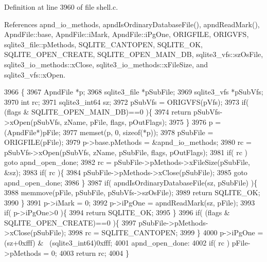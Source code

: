 Definition at line 3960 of file shell.\+c.



References apnd\+\_\+io\+\_\+methods, apnd\+Is\+Ordinary\+Database\+File(), apnd\+Read\+Mark(), Apnd\+File\+::base, Apnd\+File\+::i\+Mark, Apnd\+File\+::i\+Pg\+One, O\+R\+I\+G\+F\+I\+LE, O\+R\+I\+G\+V\+FS, sqlite3\+\_\+file\+::p\+Methods, S\+Q\+L\+I\+T\+E\+\_\+\+C\+A\+N\+T\+O\+P\+EN, S\+Q\+L\+I\+T\+E\+\_\+\+OK, S\+Q\+L\+I\+T\+E\+\_\+\+O\+P\+E\+N\+\_\+\+C\+R\+E\+A\+TE, S\+Q\+L\+I\+T\+E\+\_\+\+O\+P\+E\+N\+\_\+\+M\+A\+I\+N\+\_\+\+DB, sqlite3\+\_\+vfs\+::sz\+Os\+File, sqlite3\+\_\+io\+\_\+methods\+::x\+Close, sqlite3\+\_\+io\+\_\+methods\+::x\+File\+Size, and sqlite3\+\_\+vfs\+::x\+Open.


\begin{DoxyCode}
3966  \{
3967   ApndFile *p;
3968   sqlite3_file *pSubFile;
3969   sqlite3_vfs *pSubVfs;
3970   \textcolor{keywordtype}{int} rc;
3971   sqlite3_int64 sz;
3972   pSubVfs = ORIGVFS(pVfs);
3973   \textcolor{keywordflow}{if}( (flags & SQLITE_OPEN_MAIN_DB)==0 )\{
3974     \textcolor{keywordflow}{return} pSubVfs->xOpen(pSubVfs, zName, pFile, flags, pOutFlags);
3975   \}
3976   p = (ApndFile*)pFile;
3977   memset(p, 0, \textcolor{keyword}{sizeof}(*p));
3978   pSubFile = ORIGFILE(pFile);
3979   p->base.pMethods = &apnd_io_methods;
3980   rc = pSubVfs->xOpen(pSubVfs, zName, pSubFile, flags, pOutFlags);
3981   \textcolor{keywordflow}{if}( rc ) \textcolor{keywordflow}{goto} apnd\_open\_done;
3982   rc = pSubFile->pMethods->xFileSize(pSubFile, &sz);
3983   \textcolor{keywordflow}{if}( rc )\{
3984     pSubFile->pMethods->xClose(pSubFile);
3985     \textcolor{keywordflow}{goto} apnd\_open\_done;
3986   \}
3987   \textcolor{keywordflow}{if}( apndIsOrdinaryDatabaseFile(sz, pSubFile) )\{
3988     memmove(pFile, pSubFile, pSubVfs->szOsFile);
3989     \textcolor{keywordflow}{return} SQLITE_OK;
3990   \}
3991   p->iMark = 0;
3992   p->iPgOne = apndReadMark(sz, pFile);
3993   \textcolor{keywordflow}{if}( p->iPgOne>0 )\{
3994     \textcolor{keywordflow}{return} SQLITE_OK;
3995   \}
3996   \textcolor{keywordflow}{if}( (flags & SQLITE_OPEN_CREATE)==0 )\{
3997     pSubFile->pMethods->xClose(pSubFile);
3998     rc = SQLITE_CANTOPEN;
3999   \}
4000   p->iPgOne = (sz+0xfff) & ~(sqlite3_int64)0xfff;
4001 apnd\_open\_done:
4002   \textcolor{keywordflow}{if}( rc ) pFile->pMethods = 0;
4003   \textcolor{keywordflow}{return} rc;
4004 \}
\end{DoxyCode}
\mbox{\label{shell_8c_a504ea3b4aa62fb9f60b440e242d28538}} 

